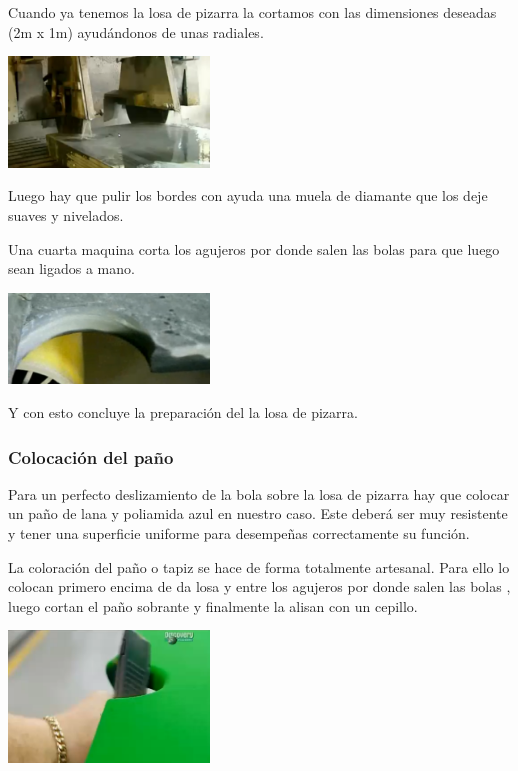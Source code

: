 Cuando ya tenemos la losa de pizarra la cortamos con las dimensiones deseadas (2m x 1m) ayudándonos de unas radiales. 
\begin{center}
	    		\includegraphics[width=0.4\textwidth]{Pantallazo-6.png}

	\end{center}

Luego hay que  pulir los bordes con ayuda una muela de diamante que los deje suaves y nivelados.

Una cuarta maquina corta los agujeros por donde salen las bolas para que luego sean ligados a mano.

\begin{center}
	    		\includegraphics[width=0.4\textwidth]{Pantallazo-7.png}

	\end{center} Y con esto concluye la preparación del la losa de pizarra.
 
		\subsubsection {Colocación del paño}
  	
 	Para un perfecto deslizamiento de la bola sobre la losa de pizarra hay que colocar un paño de lana y poliamida azul en nuestro caso. Este deberá ser muy resistente y tener una superficie uniforme para desempeñas correctamente su función.

	La coloración del paño o tapiz se hace de forma totalmente artesanal. Para ello lo colocan primero encima de da losa y entre los agujeros por donde salen las bolas , luego cortan el paño sobrante y finalmente la alisan con un cepillo. 
	\begin{center}
    			\includegraphics[width=0.4\textwidth]{Pantallazo.png}
		\end{center}
   
